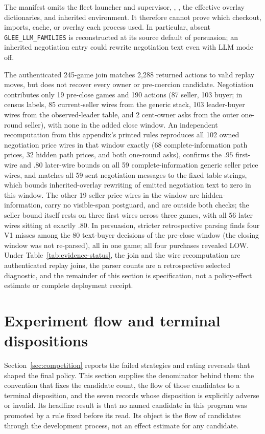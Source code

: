 The manifest omits the fleet launcher and supervisor, ,
, the effective overlay dictionaries, and inherited
environment. It therefore cannot prove which checkout, imports, cache, or
overlay each process used. In particular, absent \texttt{GLEE\_LLM\_FAMILIES}
is reconstructed at its source default of persuasion; an inherited negotiation
entry could rewrite negotiation text even with LLM mode off.

The authenticated 245-game join matches 2,288 returned actions to valid replay
moves, but does not recover every owner or pre-coercion candidate. Negotiation
contributes only 19 pre-close games and 190 actions (87 seller, 103 buyer; in
census labels, 85 current-seller wires from the generic stack, 103
leader-buyer wires from the observed-leader table, and 2 cent-owner asks from
the outer one-round seller), with none in the added close window. An
independent recomputation from this appendix's printed rules reproduces all
102 owned negotiation price wires in that window exactly (68
complete-information path prices, 32 hidden path prices, and both one-round
asks), confirms the $.95$ first-wire and $.80$ later-wire bounds on all 59
complete-information generic seller price wires, and matches all 59 sent
negotiation messages to the fixed table strings, which bounds
inherited-overlay rewriting of emitted negotiation text to zero in this
window. The other 19 seller price wires in the window are
hidden-information, carry no visible-span postguard, and are outside both
checks; the seller bound itself rests on three first wires across three
games, with all 56 later wires sitting at exactly $.80$. In
persuasion, stricter retrospective parsing finds four V1 misses among the 80
text-buyer decisions of the pre-close window (the closing window was not
re-parsed), all in one game; all four purchases revealed LOW. Under
Table~\ref{tab:evidence-status}, the join and the wire recomputation are
authenticated replay joins, the parser counts are a retrospective selected
diagnostic, and the remainder of this section is specification, not a
policy-effect estimate or complete deployment receipt.

\section{Experiment flow and terminal dispositions}
\label{app:experiment-flow}

Section~\ref{sec:competition} reports the failed strategies and rating
reversals that shaped the final policy. This section supplies the denominator
behind them: the convention that fixes the candidate count, the flow of those
candidates to a terminal disposition, and the seven records whose disposition
is explicitly adverse or invalid. Its headline result is that no named
candidate in this program was promoted by a rule fixed before its read. Its object is the flow of
candidates through the development process, not an effect estimate for any
candidate.

